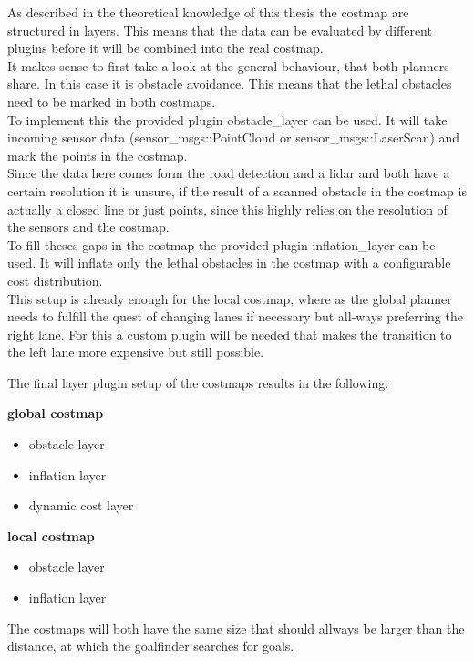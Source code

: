 As described in the theoretical knowledge of this thesis the costmap are structured in layers. This means that the data can be evaluated by different plugins before it will be combined into the real costmap.\\

It makes sense to first take a look at the general behaviour, that both planners share. In this case it is obstacle avoidance. This means that the lethal obstacles need to be marked in both costmaps.\\

To implement this the provided plugin obstacle\_layer can be used. It will take incoming sensor data (sensor\_msgs::PointCloud or sensor\_msgs::LaserScan) and mark the points in the costmap.\\

Since the data here comes form the road detection and a lidar and both have a certain resolution it is unsure, if the result of a scanned obstacle in the costmap is actually a closed line or just points, since this highly relies on the resolution of the sensors and the costmap.\\

To fill theses gaps in the costmap the provided plugin inflation\_layer can be used. It will inflate only the lethal obstacles in the costmap with a configurable cost distribution.\\

This setup is already enough for the local costmap, where as the global planner needs to fulfill the quest of changing lanes if necessary but all-ways preferring the right lane. For this a custom plugin will be needed that makes the transition to the left lane more expensive but still possible.


The final layer plugin setup of the costmaps results in the following:

\textbf{global costmap}
\begin{itemize}
	\item obstacle layer
	\item inflation layer
	\item dynamic cost layer
\end{itemize}

\textbf{local costmap}
\begin{itemize}
	\item obstacle layer
	\item inflation layer
\end{itemize}

The costmaps will both have the same size that should allways be larger than the distance, at which the goalfinder searches for goals.

